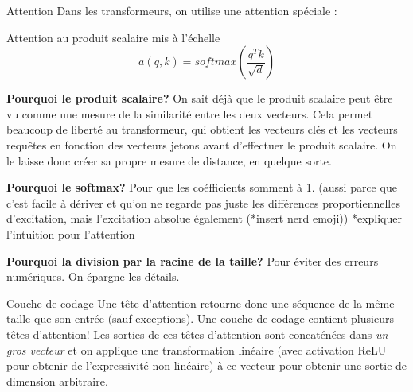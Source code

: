 \documentclass{beamer}
\begin{document}
\begin{frame}{Attention}
Dans les transformeurs, on utilise une attention spéciale :
\begin{block}{Attention au produit scalaire mis à l'échelle}
    \[ a(q, k) = softmax( \frac{q^Tk}{\sqrt{d}}) \]
\end{block}


{\bf Pourquoi le produit scalaire?}
On sait déjà que le produit scalaire peut être vu comme une mesure de la similarité entre
les deux vecteurs. Cela permet beaucoup de liberté au transformeur, qui obtient les vecteurs clés et les vecteurs requêtes en fonction des vecteurs jetons avant d'effectuer le produit scalaire. On le laisse donc créer sa propre mesure de distance, en quelque sorte.

\end{frame}

\begin{frame}{}
    
{\bf Pourquoi le softmax?}
Pour que les coéfficients somment à 1. (aussi parce que c'est facile à dériver et qu'on ne regarde pas juste les différences proportiennelles d'excitation, mais l'excitation absolue également (*insert nerd emoji)) *expliquer l'intuition pour l'attention

{\bf Pourquoi la division par la racine de la taille? }
Pour éviter des erreurs numériques. On épargne les détails.

\end{frame}

\begin{frame}{Couche de codage}
    Une tête d'attention retourne donc une séquence de la même taille que son entrée (sauf exceptions).
    Une couche de codage contient plusieurs têtes d'attention! Les sorties de ces 
    têtes d'attention sont concaténées dans {\it un gros vecteur} et on applique une transformation 
    linéaire (avec activation ReLU pour obtenir de l'expressivité non linéaire) à ce vecteur pour obtenir une sortie 
    de dimension arbitraire.
\end{frame}
\end{document}
